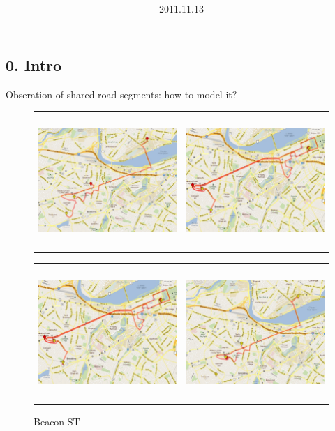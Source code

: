 \documentclass{article}
\title{\vspace{0.3in}\textmd{\textbf{\hmwkTitle}}}
\date{2011.11.13}
\begin{document}
\begin{spacing}{1.1}
\maketitle

\section{0. Intro}
Obseration of shared road segments: how to model it?
\begin{figure}
\centering
\begin{tabular}{cc}
\includegraphics[width=3in,height=2in]{day1.jpg} &
\includegraphics[width=3in,height=2in]{day2.jpg}
\end{tabular}
\begin{tabular}{cc}
\includegraphics[width=3in,height=2in]{day3.jpg} &
\includegraphics[width=3in,height=2in]{day4.jpg}
\end{tabular}
\caption{Beacon ST}
\end{figure}


\end{spacing}
\end{document}
